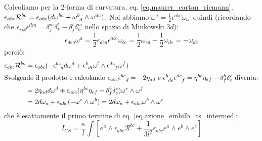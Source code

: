 Calcoliamo per la 2-forma di curvatura, eq. \ref{eq.maurer_cartan_riemann}, $\epsilon_{abc}\mathcal R^{bc}= \epsilon_{abc}(d\omega^{bc} + \tensor{\omega}{^b_d}\wedge \omega^{dc})$. Noi abbiamo $\omega^a = \frac{1}{2}\epsilon^{abc}\omega_{bc}$ quindi (ricordando che $\epsilon_{ijk}\epsilon^{ilm} =  \delta_j^m\delta_k^l -\delta_j^l\delta_k^m$ nello spazio di Minkowski $3d$):
\begin{equation*}
    \epsilon_{dea}\omega^a = \frac{1}{2}\epsilon_{dea}\epsilon^{abc}\omega_{bc} = \frac{1}{2}\omega_{ed} - \frac{1}{2}\omega_{de} = -\omega_{de}
\end{equation*}
perciò:
\begin{align*}
    \epsilon_{abc}\mathcal R^{bc} &= \epsilon_{abc}(-\tensor{\epsilon}{^{bc}_d}d\omega^d + \tensor{\epsilon}{^b_{dl}}\omega^l\wedge\tensor{\epsilon}{^{dc}_f}\omega^f) \\
    \intertext{Svolgendo il prodotto e calcolando  $\epsilon_{abc}\tensor{\epsilon}{^{bc}_d} = -2\eta_{ad}$ e $\tensor{\epsilon}{^b_{de}}\tensor{\epsilon}{^{dc}_f} = \eta^{bc}\eta_{ef}  - \delta^b_f \delta^c_e$ diventa:}
    &= 2\eta_{ad}d\omega^d +\epsilon_{abc}(\eta^{bc}\eta_{ef}  - \delta^b_f \delta^c_e)\omega^e\wedge\omega^f \\
    &=2d\omega_a + \epsilon_{abc}(-\omega^c\wedge\omega^b)= 2d\omega_a + \epsilon_{abc}\omega^b\wedge\omega^c
\end{align*}
che è esattamente il primo termine di eq. \ref{eq.azione_einhilb_cs_intermed}:
\begin{equation*}
    I_{CS} = \frac{\kappa}{l}\int \left[ e^a\wedge \epsilon_{abc}\mathcal R^{bc} + \frac{1}{3l^2}\epsilon_{abc}e^a\wedge e^b \wedge e^c \right]
\end{equation*}

